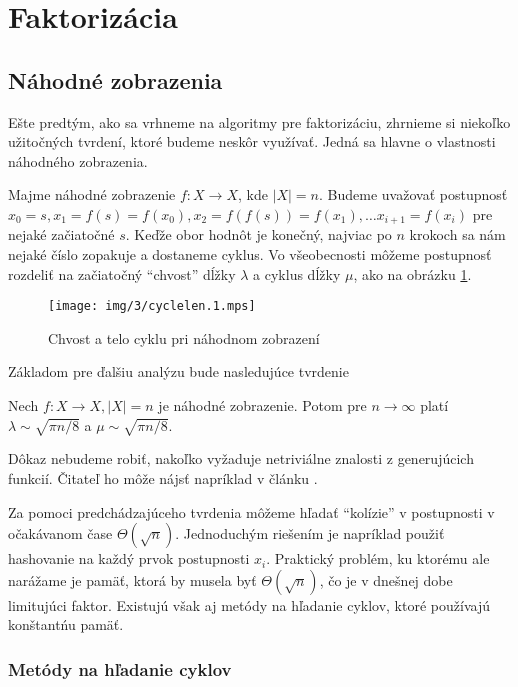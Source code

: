 \section{Faktorizácia}

\subsection{Náhodné zobrazenia}
Ešte predtým, ako sa vrhneme na algoritmy pre faktorizáciu, zhrnieme
si niekoľko užitočných tvrdení, ktoré budeme neskôr využívať. Jedná sa
hlavne o vlastnosti náhodného zobrazenia.

Majme náhodné zobrazenie $f:X \rightarrow X$, kde $|X| = n$.
Budeme uvažovať postupnosť $x_0 = s, x_1=f(s)=f(x_0), x_2 =
f(f(s))=f(x_1), \dots x_{i+1} = f(x_{i})$ pre nejaké začiatočné $s$.
Keďže obor hodnôt je konečný, najviac po $n$ krokoch sa nám nejaké
číslo zopakuje a dostaneme cyklus. Vo všeobecnosti môžeme postupnosť
rozdeliť na začiatočný ``chvost'' dĺžky $\lambda$ a cyklus dĺžky
$\mu$, ako na obrázku \ref{fig:cyclelen}.

\begin{figure}[H]
    \caption{Chvost a telo cyklu pri náhodnom zobrazení}
    \label{fig:cyclelen}
    \centering
    \texttt{[image: img/3/cyclelen.1.mps]}
\end{figure}

Základom pre ďalšiu analýzu bude nasledujúce tvrdenie
\begin{lema}
    Nech $f:X\rightarrow X, |X|=n$ je náhodné zobrazenie.
    Potom pre $n\rightarrow \infty$ platí
    $\lambda \sim \sqrt{\pi n/8}$ a 
    $\mu \sim \sqrt{\pi n/8}$.
\end{lema}
\begin{dokaz}
    Dôkaz nebudeme robiť, nakoľko vyžaduje netriviálne znalosti
    z generujúcich funkcií. Čitateľ ho môže nájsť napríklad v článku
    \cite{randommap}.
\end{dokaz}

Za pomoci predchádzajúceho tvrdenia môžeme hľadať ``kolízie'' v
postupnosti v očakávanom čase $\Theta(\sqrt{n})$.
Jednoduchým riešením je napríklad použiť hashovanie na každý prvok
postupnosti $x_i$. Praktický problém, ku ktorému ale narážame je
pamäť, ktorá by musela byť $\Theta(\sqrt{n})$, čo je v dnešnej dobe
limitujúci faktor. Existujú však aj metódy na hľadanie cyklov,
ktoré používajú konštantńu pamäť.

\subsubsection{Metódy na hľadanie cyklov}

